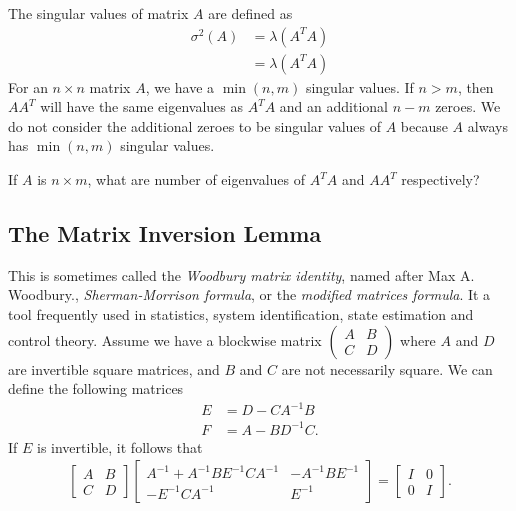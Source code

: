 The singular values of matrix $A$ are defined as 
%
\begin{align}
	\sigma^2 (A) &= \lambda (A^TA) \nonumber \\
						&= \lambda (A^TA)
\end{align}
%
For an $n \times n$ matrix $A$, we have a $\min(n,m)$ singular values. If $n > m$, then $AA^T$ will have the same eigenvalues as $A^TA$ and an additional $n-m$ zeroes. We do not consider the additional zeroes to be singular values of $A$ because $A$ always has $\min (n, m)$ singular values.
%
\begin{quiz}
	If $A$ is $n \times m$, what are number of eigenvalues of $A^TA$ and $AA^T$ respectively?
\end{quiz}




\subsection{The Matrix Inversion Lemma}
%
This is sometimes called the \textit{Woodbury matrix identity}, named after Max A. Woodbury., \textit{Sherman-Morrison formula}, or the \textit{modified matrices formula}.  It a tool frequently used in statistics, system identification, state estimation and control theory. Assume we have a blockwise matrix 
%
$\left(\begin{array}{cc}
	A & B \\ C & D
\end{array}\right)$
%
where $A$ and $D$ are invertible square matrices, and $B$ and $C$ are not necessarily square. We can define the following matrices
%
\begin{align}
	E &= D - C A^{-1} B \nonumber \\
	F &= A - BD^{-1} C.
\end{align}
%
If $E$ is invertible, it follows that
%
\begin{align}
	\begin{bmatrix}
		A & B \\ C & D
	\end{bmatrix}
		\begin{bmatrix}
	A^{-1}  + A^{-1} B E^{-1} C A^{-1} & -A^{-1}B E^{-1} \\ -E^{-1} C A^{-1} & E^{-1}
	\end{bmatrix}
	=
	\begin{bmatrix}
	I & 0 \\ 0 & I
	\end{bmatrix}.
	\label{eq:inv_lemma1}
\end{align}
